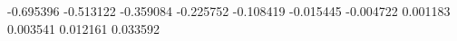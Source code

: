 -0.695396
-0.513122
-0.359084
-0.225752
-0.108419
-0.015445
-0.004722
0.001183
0.003541
0.012161
0.033592
